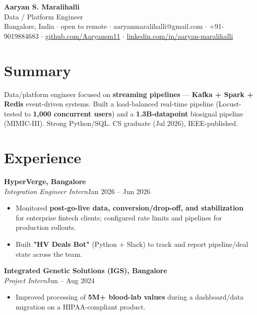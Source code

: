 \documentclass[10pt,a4paper]{article}
\begin{document}
\vspace*{-1cm}
\begin{center}
{\LARGE\bfseries Aaryan S. Maralihalli}\\[0.5em]
{\large Data / Platform Engineer}\\[0.3em]
Bangalore, India $\cdot$ open to remote $\cdot$ aaryanmaralihalli@gmail.com $\cdot$ +91-9019884683 $\cdot$ \href{https://github.com/Aaryansm11}{github.com/Aaryansm11} $\cdot$ \href{https://linkedin.com/in/aaryan-maralihalli}{linkedin.com/in/aaryan-maralihalli}
\end{center}\vspace{0.4ex}
\section*{Summary}
Data/platform engineer focused on \textbf{streaming pipelines} --- \textbf{Kafka + Spark + Redis} event-driven systems. Built a load-balanced real-time pipeline (Locust-tested to \textbf{1,000 concurrent users}) and a \textbf{1.3B-datapoint} biosignal pipeline (MIMIC-III). Strong Python/SQL. CS graduate (Jul 2026), IEEE-published.\par\vspace{2pt}
\section*{Experience}
\vspace{1pt}\textbf{HyperVerge, Bangalore}\\
\textit{Integration Engineer Intern}\hfill Jan 2026 -- Jun 2026\par\vspace{1pt}
\begin{itemize}
\item Monitored \textbf{post-go-live data, conversion/drop-off, and stabilization} for enterprise fintech clients; configured rate limits and pipelines for production rollouts.
\item Built \textbf{"HV Deals Bot"} (Python + Slack) to track and report pipeline/deal state across the team.
\end{itemize}
\vspace{1pt}\textbf{Integrated Genetic Solutions (IGS), Bangalore}\\
\textit{Project Intern}\hfill Jun -- Aug 2024\par\vspace{1pt}
\begin{itemize}
\item Improved processing of \textbf{5M+ blood-lab values} during a dashboard/data migration on a HIPAA-compliant product.
\end{itemize}
\end{document}
